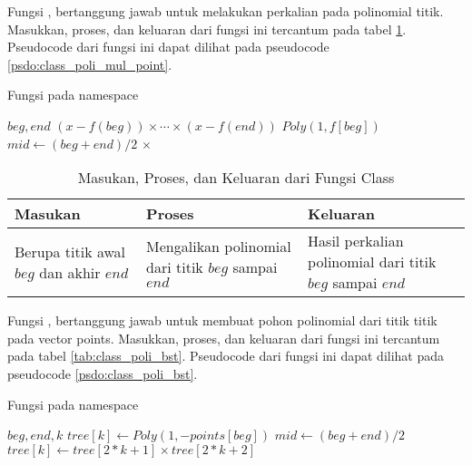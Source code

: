 \newpage

Fungsi , bertanggung jawab untuk melakukan perkalian pada polinomial titik. Masukkan, proses, dan keluaran dari fungsi ini tercantum pada tabel \ref{tab:class_poli_mul_point}. Pseudocode dari fungsi ini dapat dilihat pada pseudocode \ref{psdo:class_poli_mul_point}.

\begin{algorithm}
	\caption{Fungsi  pada namespace }
	\label{psdo:class_poli_mul_point}
	\begin{algorithmic}[1]
		\Require $ beg, end $
		\Ensure $ (x - f(beg)) \times \cdots \times (x - f(end)) $
			\State \Return $Poly(1, f[beg])$
		\EndIf
		\State $ mid \leftarrow (beg + end) / 2 $
		\State \Return {} $\times$ 
	\end{algorithmic}
\end{algorithm}

\begin{table}[]	
	\Centering
	\begin{tabular}{|p{3cm}|p{3cm}|p{3cm}|}
	\hline
	Masukan & Proses & Keluaran \\ \hline
	Berupa titik awal $beg$ dan akhir $end$ & Mengalikan polinomial dari titik $beg$ sampai $end$ & Hasil perkalian polinomial dari titik $beg$ sampai $end$ \\ \hline
	\end{tabular}
	\caption{Masukan, Proses, dan Keluaran dari Fungsi  Class }
	\label{tab:class_poli_mul_point}
\end{table}

\newpage

Fungsi , bertanggung jawab untuk membuat pohon polinomial dari titik titik pada vector points. Masukkan, proses, dan keluaran dari fungsi ini tercantum pada tabel \ref{tab:class_poli_bst}. Pseudocode dari fungsi ini dapat dilihat pada pseudocode \ref{psdo:class_poli_bst}.

\begin{algorithm}
	\caption{Fungsi  pada namespace }
	\label{psdo:class_poli_bst}
	\begin{algorithmic}[1]
		\Require $ beg, end, k $
			\State $ tree[k] \leftarrow Poly(1, -points[beg]) $
		\Else
			\State $ mid \leftarrow (beg + end) / 2 $
			\State {}
			\State {}
			\State $ tree[k] \leftarrow tree[2 * k + 1] \times tree[2 * k + 2]$
		\EndIf
	\end{algorithmic}
\end{algorithm}

